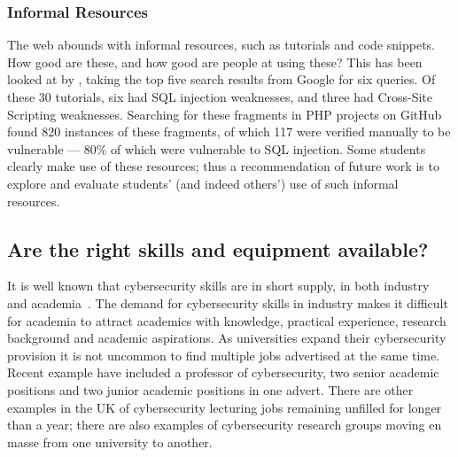 \documentclass[sigconf]{acmart}
\begin{document}
\subsubsection{Informal Resources}
\begin{comment}
took out foot notes for space
The web abounds with informal resources, such as tutorials and code snippets. How good are these, and how good are people at using these? This has been looked at by \cite{Unruhetal2017a}, taking the top five search results from Google for six queries. Of these 30 tutorials, six had SQL injection weaknesses, and three had Cross-Site Scripting\footnote{Number 7 in OWASP's Top Ten \cite{OWASP2017a}.} weaknesses. Searching for these fragments in PHP projects on GitHub found 820 instances of these fragments, of which 117 were verified manually to be vulnerable --- 80\% of which were vulnerable to SQL injection. Some students clearly make use of these resources; thus a recommendation of future work is to explore and evaluate students' (and indeed others') use of such informal resources. 
\end{comment}

The web abounds with informal resources, such as tutorials and code snippets. How good are these, and how good are people at using these? This has been looked at by \cite{Unruhetal2017a}, taking the top five search results from Google for six queries. Of these 30 tutorials, six had SQL injection weaknesses, and three had Cross-Site Scripting weaknesses. Searching for these fragments in PHP projects on GitHub found 820 instances of these fragments, of which 117 were verified manually to be vulnerable --- 80\% of which were vulnerable to SQL injection. Some students clearly make use of these resources; thus a recommendation of future work is to explore and evaluate students' (and indeed others') use of such informal resources. 

\subsection{Are the right skills and equipment available?}
It is well known that cybersecurity skills are in short supply, in both industry~\cite{Ackerman2019a} and academia~\cite{schneider2013}. The demand for cybersecurity skills in industry makes it difficult for academia to attract academics with knowledge, practical experience, research background and academic aspirations. As universities expand their cybersecurity provision it is not uncommon to find multiple jobs advertised at the same time. Recent example have included a professor of cybersecurity, two senior academic positions and two junior academic positions in one advert. There are other examples in the UK of cybersecurity lecturing jobs remaining unfilled for longer than a year; there are also examples of cybersecurity research groups moving en masse from one university to another.
\end{document}
